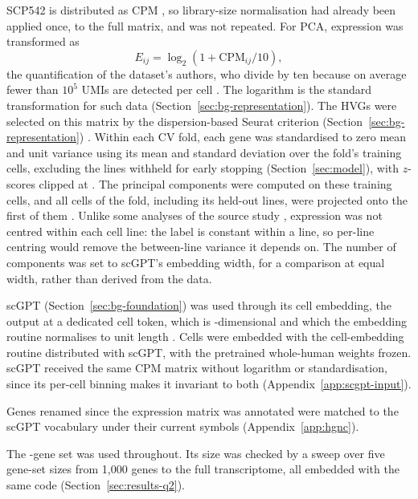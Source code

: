 SCP542 is distributed as CPM \cite{scp542_portal}, so library-size normalisation
had already been applied once, to the full matrix, and was not repeated. For PCA, expression was transformed
as
\begin{equation}
  E_{ij} = \log_2\!\left(1 + \mathrm{CPM}_{ij}/10\right),
  \label{eq:log}
\end{equation}
the quantification of the dataset's authors, who divide by ten because on average fewer than $10^5$
UMIs are detected per cell \cite{scp542}. The logarithm is the standard transformation for such data (Section~\ref{sec:bg-representation}).
The \NHvg{} HVGs were selected on this matrix by
the dispersion-based Seurat criterion (Section~\ref{sec:bg-representation}) \cite{satija2015,wolf2018scanpy}. Within each CV fold, each gene was standardised to zero mean and unit variance using its mean and
standard deviation over the fold's training cells, excluding the lines withheld for early stopping
(Section~\ref{sec:model}), with $z$-scores clipped at \CfgZClip. The principal components were computed on
these training cells, and all cells of the fold, including its held-out lines, were projected onto the
first \NPca{} of them \cite{jolliffe2016}. Unlike some analyses of the source study \cite{scp542}, expression was not centred within each cell
line: the label is constant within a line, so per-line centring would remove the between-line variance
it depends on. The number of components was set to scGPT's embedding width, for a comparison at equal
width, rather than derived from the data.

scGPT (Section~\ref{sec:bg-foundation}) was used through its cell embedding, the output at a dedicated
cell token, which is \NPca-dimensional \cite{scgpt} and which the embedding routine normalises to unit length \cite{scgpt_code}. Cells were embedded with the cell-embedding routine distributed with scGPT, with
the pretrained whole-human weights frozen.
scGPT received the same CPM matrix without logarithm or standardisation, since its per-cell binning
makes it invariant to both (Appendix~\ref{app:scgpt-input}).

Genes renamed since the expression matrix was annotated were matched to the scGPT vocabulary under
their current symbols (Appendix~\ref{app:hgnc}).

The \NHvg-gene set was used throughout. Its size was checked by a sweep over five gene-set sizes from
1{,}000 genes to the full transcriptome, all embedded with the same code (Section~\ref{sec:results-q2}).

